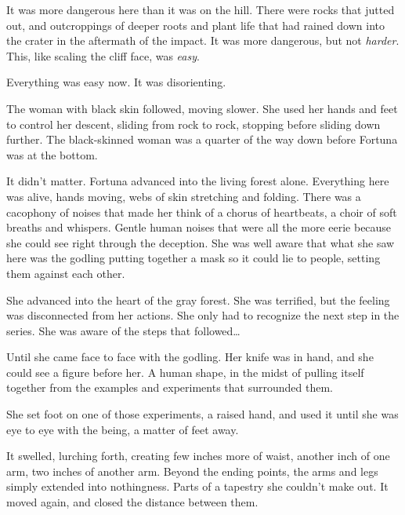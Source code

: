 It was more dangerous here than it was on the hill.  There were rocks that jutted out, and outcroppings of deeper roots and plant life that had rained down into the crater in the aftermath of the impact.  It was more dangerous, but not \emph{harder}.  This, like scaling the cliff face, was \emph{easy}.



Everything was easy now.  It was disorienting.



The woman with black skin followed, moving slower.  She used her hands and feet to control her descent, sliding from rock to rock, stopping before sliding down further.  The black-skinned woman was a quarter of the way down before Fortuna was at the bottom.



It didn't matter.  Fortuna advanced into the living forest alone.  Everything here was alive, hands moving, webs of skin stretching and folding.  There was a cacophony of noises that made her think of a chorus of heartbeats, a choir of soft breaths and whispers.  Gentle human noises that were all the more eerie because she could see right through the deception.  She was well aware that what she saw here was the godling putting together a mask so it could lie to people, setting  them against each other.



She advanced into the heart of the gray forest.  She was terrified, but the feeling was disconnected from her actions.  She only had to recognize the next step in the series.  She was aware of the steps that followed\ldots



Until she came face to face with the godling.  Her knife was in hand, and she could see a figure before her.  A human shape, in the midst of pulling itself together from the examples and experiments that surrounded them.



She set foot on one of those experiments, a raised hand, and used it until she was eye to eye with the being, a matter of feet away.



It swelled, lurching forth, creating few inches more of waist, another inch of one arm, two inches of another arm.  Beyond the ending points, the arms and legs simply extended into nothingness.  Parts of a tapestry she couldn't make out.  It moved again, and closed the distance between them.



